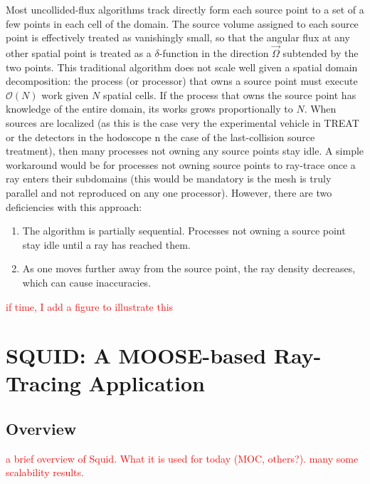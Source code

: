 \documentclass[12pt]{scrartcl}
\newcommand{\tcr}[1]{\textcolor{red}{#1}}
\begin{document}
Most uncollided-flux algorithms track directly form each source point to a set of a few points in each cell 
of the domain. The source volume assigned to each source point is effectively treated as vanishingly small, so that 
the angular flux at any other spatial point is treated as a $\delta$-function in the direction $\vec{\Omega}$ subtended 
by the two points. 
This traditional algorithm does not scale well given a spatial domain decomposition: the process (or processor) that owns
a source point must execute $\mathcal{O}(N)$ work given $N$ spatial cells. If the process that owns the  source point
has knowledge of the entire domain, its works grows proportionally to $N$. When sources are localized (as this is the case very the experimental vehicle in TREAT or the detectors in the hodoscope n the case of the last-collision source treatment), 
then many processes not owning any source points stay idle. A simple workaround would be for processes not owning source points to ray-trace once a ray enters their subdomains (this would be mandatory is the mesh is truly parallel and not reproduced on any one processor). However, there are two deficiencies with this approach:
\begin{enumerate}
\item The algorithm is partially sequential. Processes not owning a source point stay idle until a ray has reached them.
\item As one moves further away from the source point, the ray density decreases, which can cause inaccuracies.
\end{enumerate}
\tcr{if time, I add a figure to illustrate this}


\section{SQUID: A MOOSE-based Ray-Tracing Application}

\subsection{Overview}
\tcr{a brief overview of Squid. What it is used for today (MOC, others?). many some scalability results.}

\end{document}
